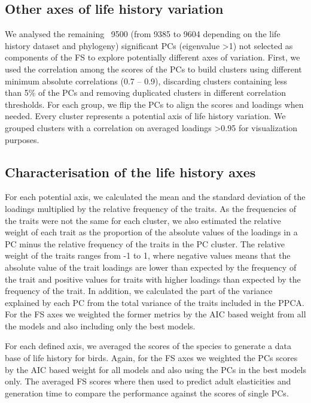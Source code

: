 \subsection*{Other axes of life history variation}

We analysed the remaining ~9500 (from 9385 to 9604 depending on the life 
history dataset and phylogeny) significant PCs (eigenvalue \textgreater{1}) not 
selected as components of the FS to explore potentially different axes of 
variation. First, we used the correlation among the scores of the PCs to build 
clusters using different minimum absolute correlations (0.7 – 0.9), discarding 
clusters containing less than 5\% of the PCs and removing duplicated clusters in 
different correlation thresholds. 
For each group, we flip the PCs to align the scores and loadings when needed. 
Every cluster represents a potential axis of life history variation. We grouped 
clusters with a correlation on averaged loadings \textgreater{0.95} for 
visualization purposes.


\subsection*{Characterisation of the life history axes}

For each potential axis, we calculated the mean and the standard deviation of 
the loadings multiplied by the relative frequency of the traits. As the 
frequencies of the traits were not the same for each cluster, we also estimated 
the relative weight of each trait as the proportion of the absolute values of 
the loadings in a PC minus the relative frequency of the traits in the PC 
cluster. The relative weight of the traits ranges from -1 to 1, where negative 
values means that the absolute value of the trait loadings are lower than 
expected by the frequency of the trait and positive values for traits with 
higher loadings than expected by the frequency of the trait. In addition, we 
calculated the part of the variance explained by each PC from the total variance 
of the traits included in the PPCA.
For the FS axes we weighted the former metrics by the AIC based weight from all 
the models and also including only the best models.

For each defined axis, we averaged the scores of the species to generate a data 
base of life history for birds. Again, for the FS axes we weighted the PCs 
scores by the AIC based weight for all models and also using the PCs in the 
best models only. The averaged FS scores where then used to predict adult 
elasticities and generation time to compare the performance against the scores 
of single PCs.


